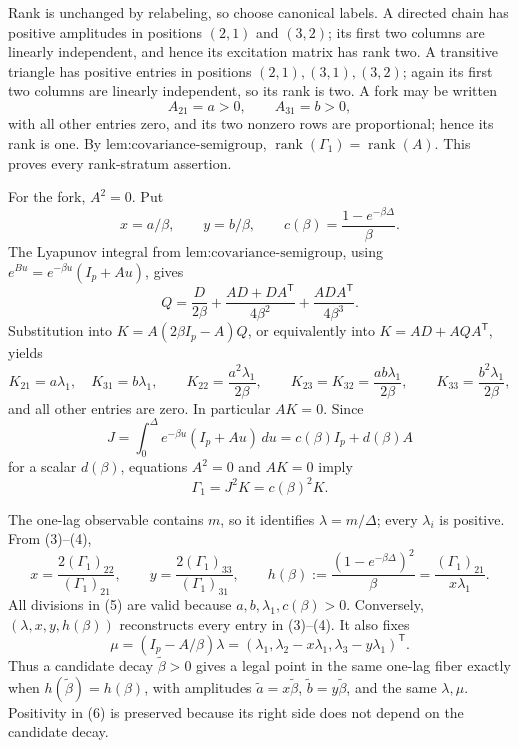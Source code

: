 Rank is unchanged by relabeling, so choose canonical labels.  A directed chain has positive amplitudes in positions \((2,1)\) and \((3,2)\); its first two columns are linearly independent, and hence its excitation matrix has rank two.  A transitive triangle has positive entries in positions \((2,1),(3,1),(3,2)\); again its first two columns are linearly independent, so its rank is two.  A fork may be written
\[
 A_{21}=a>0,\qquad A_{31}=b>0,
\]
with all other entries zero, and its two nonzero rows are proportional; hence its rank is one.  By \(\text{lem:covariance-semigroup}\), \(\operatorname{rank}(\Gamma_1)=\operatorname{rank}(A)\).  This proves every rank-stratum assertion.

For the fork, \(A^2=0\).  Put
\[
 x=a/\beta,\qquad y=b/\beta,\qquad
 c(\beta)=\frac{1-e^{-\beta\Delta}}{\beta}.
\tag{1}
\]
The Lyapunov integral from \(\text{lem:covariance-semigroup}\), using \(e^{Bu}=e^{-\beta u}(I_p+Au)\), gives
\[
 Q=\frac{D}{2\beta}+\frac{AD+DA^{\mathsf T}}{4\beta^2}
   +\frac{ADA^{\mathsf T}}{4\beta^3}.
\tag{2}
\]
Substitution into \(K=A(2\beta I_p-A)Q\), or equivalently into \(K=AD+AQA^{\mathsf T}\), yields
\[
 K_{21}=a\lambda_1,\quad K_{31}=b\lambda_1,\qquad
 K_{22}=\frac{a^2\lambda_1}{2\beta},\qquad
 K_{23}=K_{32}=\frac{ab\lambda_1}{2\beta},\qquad
 K_{33}=\frac{b^2\lambda_1}{2\beta},
\tag{3}
\]
and all other entries are zero.  In particular \(AK=0\).  Since
\[
 J=\int_0^\Delta e^{-\beta u}(I_p+Au)\,du=c(\beta)I_p+d(\beta)A
\]
for a scalar \(d(\beta)\), equations \(A^2=0\) and \(AK=0\) imply
\[
 \Gamma_1=J^2K=c(\beta)^2K.
\tag{4}
\]

The one-lag observable contains \(m\), so it identifies \(\lambda=m/\Delta\); every \(\lambda_i\) is positive.  From (3)--(4),
\[
 x=\frac{2(\Gamma_1)_{22}}{(\Gamma_1)_{21}},\qquad
 y=\frac{2(\Gamma_1)_{33}}{(\Gamma_1)_{31}},\qquad
 h(\beta):=\frac{(1-e^{-\beta\Delta})^2}{\beta}
 =\frac{(\Gamma_1)_{21}}{x\lambda_1}.
\tag{5}
\]
All divisions in (5) are valid because \(a,b,\lambda_1,c(\beta)>0\).  Conversely, \((\lambda,x,y,h(\beta))\) reconstructs every entry in (3)--(4).  It also fixes
\[
 \mu=(I_p-A/\beta)\lambda
 =(\lambda_1,\lambda_2-x\lambda_1,\lambda_3-y\lambda_1)^{\mathsf T}.
\tag{6}
\]
Thus a candidate decay \(\widetilde\beta>0\) gives a legal point in the same one-lag fiber exactly when \(h(\widetilde\beta)=h(\beta)\), with amplitudes \(\widetilde a=x\widetilde\beta\), \(\widetilde b=y\widetilde\beta\), and the same \(\lambda,\mu\).  Positivity in (6) is preserved because its right side does not depend on the candidate decay.


